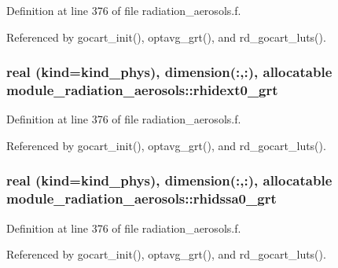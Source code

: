 Definition at line 376 of file radiation\+\_\+aerosols.\+f.



Referenced by gocart\+\_\+init(), optavg\+\_\+grt(), and rd\+\_\+gocart\+\_\+luts().

\subsubsection[{\texorpdfstring{rhidext0\+\_\+grt}{rhidext0_grt}}]{\setlength{\rightskip}{0pt plus 5cm}real (kind=kind\+\_\+phys), dimension(\+:,\+:), allocatable module\+\_\+radiation\+\_\+aerosols\+::rhidext0\+\_\+grt\hspace{0.3cm}{\ttfamily [private]}}\hypertarget{group__module__radiation__aerosols_ga6683021bded82850053c16eb3e906998}{}\label{group__module__radiation__aerosols_ga6683021bded82850053c16eb3e906998}


Definition at line 376 of file radiation\+\_\+aerosols.\+f.



Referenced by gocart\+\_\+init(), optavg\+\_\+grt(), and rd\+\_\+gocart\+\_\+luts().

\subsubsection[{\texorpdfstring{rhidssa0\+\_\+grt}{rhidssa0_grt}}]{\setlength{\rightskip}{0pt plus 5cm}real (kind=kind\+\_\+phys), dimension(\+:,\+:), allocatable module\+\_\+radiation\+\_\+aerosols\+::rhidssa0\+\_\+grt\hspace{0.3cm}{\ttfamily [private]}}\hypertarget{group__module__radiation__aerosols_gaea46db63db26a316e73640bc63f75383}{}\label{group__module__radiation__aerosols_gaea46db63db26a316e73640bc63f75383}


Definition at line 376 of file radiation\+\_\+aerosols.\+f.



Referenced by gocart\+\_\+init(), optavg\+\_\+grt(), and rd\+\_\+gocart\+\_\+luts().


